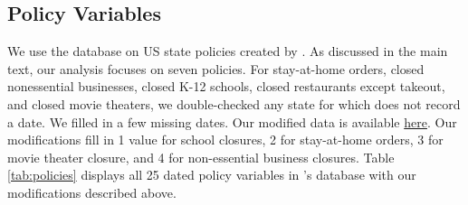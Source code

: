 \documentclass[11pt,reqno,letter]{amsart}
\theoremstyle{definition}
\begin{document}
\subsection{Policy Variables}

We use the database on US state policies created by
\cite{raifman2020}. %
As discussed in the main text, our analysis focuses on seven policies. For stay-at-home orders, closed nonessential
businesses, closed K-12 schools, closed restaurants except takeout,
and closed movie theaters, we double-checked any
state for which \cite{raifman2020} does not record a date. We filled
in a few missing dates. Our modified data is available
\href{"https://docs.google.com/spreadsheets/d/1E6HRkgbdSnZ9ZxrneydU6q4hhOCCt9oTl_5fa3OFVZE/edit?usp=sharing}{here}. Our
modifications fill in 1 value for school closures, 2 for stay-at-home orders, 3 for movie theater closure, and 4 for
non-essential business closures. Table \ref{tab:policies} displays all 25 dated policy variables in
\cite{raifman2020}'s database with our modifications described above.


\afterpage{%
  \clearpage%
  \thispagestyle{empty}%
  \begin{landscape}%
    \centering %
    
  \end{landscape}
  \clearpage%
}
\end{document}
